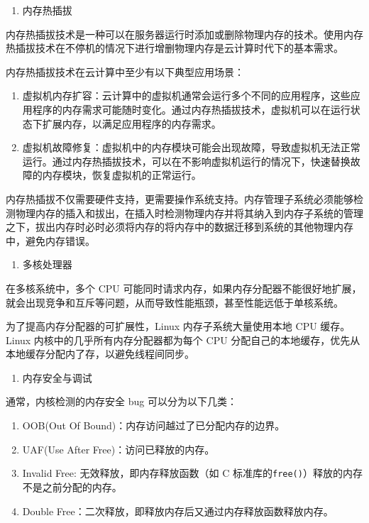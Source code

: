 \documentclass[AutoFakeBold]{LZUThesis}
\newcommand{\tightlist}{%
  \setlength{\itemsep}{0pt}\setlength{\parskip}{0pt}}
\begin{document}
\begin{sloppypar}
\begin{enumerate}
\def\labelenumi{\arabic{enumi}.}
\setcounter{enumi}{1}
\tightlist
\item
  内存热插拔
\end{enumerate}

内存热插拔技术是一种可以在服务器运行时添加或删除物理内存的技术。使用内存热插拔技术在不停机的情况下进行增删物理内存是云计算时代下的基本需求。

内存热插拔技术在云计算中至少有以下典型应用场景：

\begin{enumerate}
\def\labelenumi{\arabic{enumi}.}
\item
  虚拟机内存扩容：云计算中的虚拟机通常会运行多个不同的应用程序，这些应用程序的内存需求可能随时变化。通过内存热插拔技术，虚拟机可以在运行状态下扩展内存，以满足应用程序的内存需求。
\item
  虚拟机故障修复：虚拟机中的内存模块可能会出现故障，导致虚拟机无法正常运行。通过内存热插拔技术，可以在不影响虚拟机运行的情况下，快速替换故障的内存模块，恢复虚拟机的正常运行。
\end{enumerate}

内存热插拔不仅需要硬件支持，更需要操作系统支持。内存管理子系统必须能够检测物理内存的插入和拔出，在插入时检测物理内存并将其纳入到内存子系统的管理之下，拔出内存时必时必须将内存的将内存中的数据迁移到系统的其他物理内存中，避免内存错误。

\begin{enumerate}
\def\labelenumi{\arabic{enumi}.}
\setcounter{enumi}{2}
\tightlist
\item
  多核处理器
\end{enumerate}

在多核系统中，多个 CPU
可能同时请求内存，如果内存分配器不能很好地扩展，就会出现竞争和互斥等问题，从而导致性能瓶颈，甚至性能远低于单核系统。

为了提高内存分配器的可扩展性，Linux 内存子系统大量使用本地 CPU
缓存。Linux 内核中的几乎所有内存分配器都为每个 CPU
分配自己的本地缓存，优先从本地缓存分配内了存，以避免线程间同步。

\begin{enumerate}
\def\labelenumi{\arabic{enumi}.}
\setcounter{enumi}{3}
\tightlist
\item
  内存安全与调试
\end{enumerate}

通常，内核检测的内存安全 bug 可以分为以下几类：

\begin{enumerate}
\def\labelenumi{\arabic{enumi}.}
\item
  OOB(Out Of Bound)：内存访问越过了已分配内存的边界。
\item
  UAF(Use After Free)：访问已释放的内存。
\item
  Invalid Free: 无效释放，即内存释放函数（如 C
  标准库的\texttt{free()}）释放的内存不是之前分配的内存。
\item
  Double Free：二次释放，即释放内存后又通过内存释放函数释放内存。
\end{enumerate}


\end{sloppypar}
\end{document}
